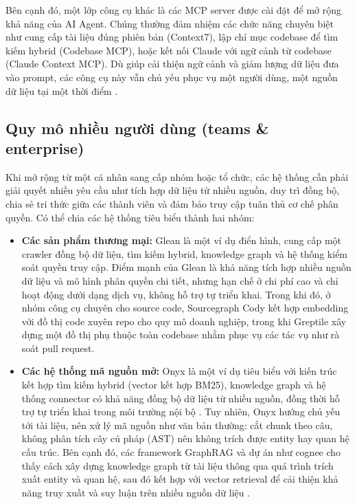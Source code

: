 Bên cạnh đó, một lớp công cụ khác là các MCP server được cài đặt để mở rộng khả năng của AI Agent. Chúng thường đảm nhiệm các chức năng chuyên biệt như cung cấp tài liệu đúng phiên bản (Context7), lập chỉ mục codebase để tìm kiếm hybrid (Codebase MCP), hoặc kết nối Claude với ngữ cảnh từ codebase (Claude Context MCP). Dù giúp cải thiện ngữ cảnh và giảm lượng dữ liệu đưa vào prompt, các công cụ này vẫn chủ yếu phục vụ một người dùng, một nguồn dữ liệu tại một thời điểm \cite{context7,codebase_mcp,claude_context_mcp}.

\subsection{Quy mô nhiều người dùng (teams \& enterprise)}

Khi mở rộng từ một cá nhân sang cấp nhóm hoặc tổ chức, các hệ thống cần phải giải quyết nhiều yêu cầu như tích hợp dữ liệu từ nhiều nguồn, duy trì đồng bộ, chia sẻ tri thức giữa các thành viên và đảm bảo truy cập tuân thủ cơ chế phân quyền. Có thể chia các hệ thống tiêu biểu thành hai nhóm:

\begin{itemize}
    \item \textbf{Các sản phẩm thương mại:} Glean là một ví dụ điển hình, cung cấp một crawler đồng bộ dữ liệu, tìm kiếm hybrid, knowledge graph và hệ thống kiểm soát quyền truy cập. Điểm mạnh của Glean là khả năng tích hợp nhiều nguồn dữ liệu và mô hình phân quyền chi tiết, nhưng hạn chế ở chi phí cao và chỉ hoạt động dưới dạng dịch vụ, không hỗ trợ tự triển khai. Trong khi đó, ở nhóm công cụ chuyên cho source code, Sourcegraph Cody kết hợp embedding với đồ thị code xuyên repo cho quy mô doanh nghiệp, trong khi Greptile xây dựng một đồ thị phụ thuộc toàn codebase nhằm phục vụ các tác vụ như rà soát pull request.
    \item \textbf{Các hệ thống mã nguồn mở:} Onyx là một ví dụ tiêu biểu với kiến trúc kết hợp tìm kiếm hybrid (vector kết hợp BM25), knowledge graph và hệ thống connector có khả năng đồng bộ dữ liệu từ nhiều nguồn, đồng thời hỗ trợ tự triển khai trong môi trường nội bộ \cite{onyx_github}. Tuy nhiên, Onyx hướng chủ yếu tới tài liệu, nên xử lý mã nguồn như văn bản thường: cắt chunk theo câu, không phân tích cây cú pháp (AST) nên không trích được entity hay quan hệ cấu trúc. Bên cạnh đó, các framework GraphRAG và dự án như cognee cho thấy cách xây dựng knowledge graph từ tài liệu thông qua quá trình trích xuất entity và quan hệ, sau đó kết hợp với vector retrieval để cải thiện khả năng truy xuất và suy luận trên nhiều nguồn dữ liệu \cite{edge2024graphrag,microsoft_graphrag,cognee}.

\end{itemize}

